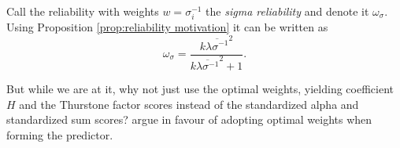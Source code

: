 \documentclass{article}
\makeatletter
\theoremstyle{plain}
\theoremstyle{plain}
\theoremstyle{definition}
\theoremstyle{remark}
\theoremstyle{definition}
\theoremstyle{plain}
\theoremstyle{plain}
\newtheorem{prop}[thm]{\protect\propositionname}
\theoremstyle{definition}
\newenvironment{proof}[1][\protect\proofname]{\par
	\normalfont\topsep6\p@\@plus6\p@\relax
	\trivlist
	\itemindent\parindent
	\item[\hskip\labelsep\scshape #1]\ignorespaces
}{%
	\endtrivlist\@endpefalse
}
\providecommand{\proofname}{Proof}
\providecommand{\propositionname}{Proposition}
\DeclareMathOperator{\MSE}{\textsc{MSE}}
\makeatother
\begin{document}
Call the reliability with weights $w=\sigma_{i}^{-1}$ the \emph{sigma reliability} and denote it $\omega_\sigma$. Using Proposition \ref{prop:reliability motivation} it can be written as
\begin{equation}
\omega_\sigma=\frac{k\overline{\lambda\sigma^{-1}}^{2}}{k\overline{\lambda\sigma^{-1}}^{2}+1}.\label{eq:Sigma-standardized reliability}
\end{equation}

But while we are at it, why not just use the optimal weights, yielding
coefficient $H$ and the Thurstone factor scores instead of the standardized
alpha and standardized sum scores? \citet{McNeish2019-ea} argue in favour of
adopting optimal weights when forming the predictor.


\end{document}
